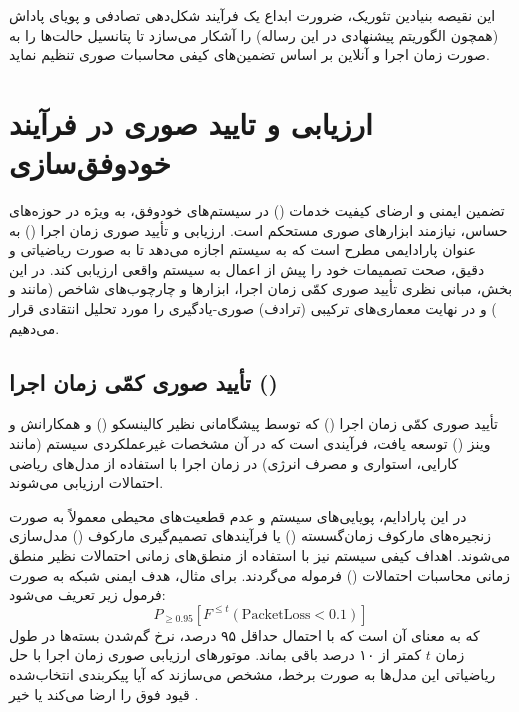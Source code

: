 \documentclass[oneside,openany,phd]{TMU-Thesis}
\begin{document}
این نقیصه بنیادین تئوریک، ضرورت ابداع یک فرآیند شکل‌دهی تصادفی و پویای پاداش (همچون الگوریتم پیشنهادی  در این رساله) را آشکار می‌سازد تا پتانسیل حالت‌ها را به صورت زمان اجرا و آنلاین بر اساس تضمین‌های کیفی محاسبات صوری تنظیم نماید.

\section{ارزیابی و تایید صوری در فرآیند خودوفق‌سازی}
\label{sec:ch3_formal_verification}

تضمین ایمنی و ارضای کیفیت خدمات () در سیستم‌های خودوفق، به ویژه در حوزه‌های حساس، نیازمند ابزارهای صوری مستحکم است. ارزیابی و تأیید صوری زمان اجرا () به عنوان پارادایمی مطرح است که به سیستم اجازه می‌دهد تا به صورت ریاضیاتی و دقیق، صحت تصمیمات خود را پیش از اعمال به سیستم واقعی ارزیابی کند. در این بخش، مبانی نظری تأیید صوری کمّی زمان اجرا، ابزارها و چارچوب‌های شاخص (مانند  و ) و در نهایت معماری‌های ترکیبی (ترادف) صوری-یادگیری را مورد تحلیل انتقادی قرار می‌دهیم.

\subsection{تأیید صوری کمّی زمان اجرا ()}
\label{sec:ch3_qvr}

تأیید صوری کمّی زمان اجرا () که توسط پیشگامانی نظیر کالینسکو () و همکارانش \cite{calinescu2011formal} و وینز () \cite{weyns2012formal} توسعه یافت، فرآیندی است که در آن مشخصات غیرعملکردی سیستم (مانند کارایی، استواری و مصرف انرژی) در زمان اجرا با استفاده از مدل‌های ریاضی احتمالات ارزیابی می‌شوند.

در این پارادایم، پویایی‌های سیستم و عدم قطعیت‌های محیطی معمولاً به صورت زنجیره‌های مارکوف زمان‌گسسته () یا فرآیندهای تصمیم‌گیری مارکوف () مدل‌سازی می‌شوند. اهداف کیفی سیستم نیز با استفاده از منطق‌های زمانی احتمالات نظیر منطق زمانی محاسبات احتمالات () فرموله می‌گردند. برای مثال، هدف ایمنی شبکه به صورت فرمول زیر تعریف می‌شود:
\begin{equation}
    P_{\geq 0.95} [ F^{\leq t} (\text{PacketLoss} < 0.1) ]
\end{equation}
که به معنای آن است که با احتمال حداقل ۹۵ درصد، نرخ گم‌شدن بسته‌ها در طول زمان $t$ کمتر از ۱۰ درصد باقی بماند. موتورهای ارزیابی صوری زمان اجرا با حل ریاضیاتی این مدل‌ها به صورت برخط، مشخص می‌سازند که آیا پیکربندی انتخاب‌شده قیود فوق را ارضا می‌کند یا خیر \cite{calinescu2011formal}.
\end{document}
